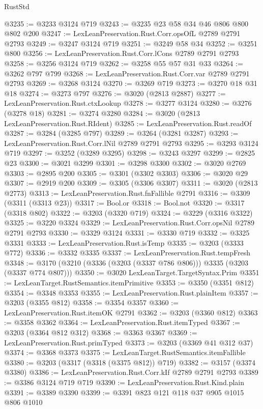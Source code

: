 \begin{lexlean}{RustStd}
\begin{coremodule}
@3235 := @3233 @3124 @719
@3243 := @3235 @23 @58 @34 @46 @806 @800 @802 @200
@3247 := LexLeanPreservation.Rust.Corr.opsOfL @2789 @2791 @2793
@3249 := @3247 @3124 @719
@3251 := @3249 @58 @34
@3252 := @3251 @800
@3256 := LexLeanPreservation.Rust.Corr.lCons @2789 @2791 @2793
@3258 := @3256 @3124 @719
@3262 := @3258 @55 @57 @31 @33
@3264 := @3262 @797 @799
@3268 := LexLeanPreservation.Rust.Corr.var @2789 @2791 @2793
@3269 := @3268 @3124
@3270 := @3269 @719
@3273 := @3270 @18 @31 @18
@3274 := @3273 @797
@3276 := @3020 (@2813 @2887)
@3277 := LexLeanPreservation.Rust.ctxLookup
@3278 := @3277 @3124
@3280 := @3276 (@3278 @18)
@3281 := @3274 @3280
@3284 := @3020 (@2813 LexLeanPreservation.Rust.RIdent)
@3285 := LexLeanPreservation.Rust.readOf
@3287 := @3284 (@3285 @797)
@3289 := @3264 (@3281 @3287)
@3293 := LexLeanPreservation.Rust.Corr.lNil @2789 @2791 @2793
@3295 := @3293 @3124 @719
@3297 := @3252 (@3289 @3295)
@3298 := @3243 @3297
@3299 := @2825 @23
@3300 := @3021 @3299
@3301 := @3298 @3300
@3302 := @3020 @2769
@3303 := @2895 @200
@3305 := @3301 (@3302 @3303)
@3306 := @3020 @29
@3307 := @2919 @200
@3309 := @3305 (@3306 @3307)
@3311 := @3020 (@2813 @2773)
@3313 := LexLeanPreservation.Rust.fnFallible @2791
@3316 := @3309 (@3311 (@3313 @23))
@3317 := Bool.or
@3318 := Bool.not
@3320 := @3317 (@3318 @802)
@3322 := @3203 (@3320 @719)
@3324 := @3229 (@3316 @3322)
@3325 := @3220 @3324
@3329 := LexLeanPreservation.Rust.Corr.opsNil @2789 @2791 @2793
@3330 := @3329 @3124
@3331 := @3330 @719
@3332 := @3325 @3331
@3333 := LexLeanPreservation.Rust.isTemp
@3335 := @3203 (@3333 @772)
@3336 := @3332 @3335
@3337 := LexLeanPreservation.Rust.tempFresh
@3348 := @3170 (@3210 (@3336 (@3203 (@3337 @786 @806))) @3335 (@3203 (@3337 @774 @807)))
@3350 := @3020 LexLeanTarget.TargetSyntax.Prim
@3351 := LexLeanTarget.RustSemantics.itemPrimitive
@3353 := @3350 (@3351 @812)
@3354 := @3348 @3353
@3355 := LexLeanPreservation.Rust.plainItem
@3357 := @3203 (@3355 @812)
@3358 := @3354 @3357
@3360 := LexLeanPreservation.Rust.itemOK @2791
@3362 := @3203 (@3360 @812)
@3363 := @3358 @3362
@3364 := LexLeanPreservation.Rust.itemTyped
@3367 := @3203 (@3364 @812 @312)
@3368 := @3363 @3367
@3369 := LexLeanPreservation.Rust.primTyped
@3373 := @3203 (@3369 @41 @312 @37)
@3374 := @3368 @3373
@3375 := LexLeanTarget.RustSemantics.itemFallible
@3380 := @3203 (@3317 (@3318 (@3375 @812)) @719)
@3382 := @3157 (@3374 @3380)
@3386 := LexLeanPreservation.Rust.Corr.kIf @2789 @2791 @2793
@3389 := @3386 @3124 @719 @719
@3390 := LexLeanPreservation.Rust.Kind.plain
@3391 := @3389 @3390
@3399 := @3391 @823 @121 @118 @37 @905 @1015 @806 @1010

\end{coremodule}
\end{lexlean}
